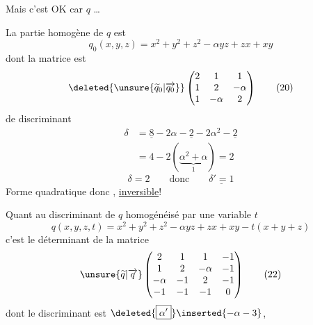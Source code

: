 Mais c'est OK car $q$ \ldots


La partie homogène de $q$ est
\[
q_0(x,y,z)=x^2+y^2+z^2-\alpha yz+zx+xy\tag*{(19)}
\]
dont la matrice est
\[
\deleted{\unsure{\widetilde q_0|\overrightarrow{q_0}}}
\begin{pmatrix}2&1&1\\1&2&-\alpha\\1&-\alpha&2\end{pmatrix}\tag*{(20)}
\]
de discriminant
\[
\begin{aligned}
\delta&=\underline{8}-2\alpha-\underline{2}-2\alpha^2-\underline{2}\\
&=4-2(\underbrace{\alpha^2+\alpha}_{1})=2
\end{aligned}
\]
\[
\delta=2\qquad\text{donc}\qquad\underline{\delta'=1}\tag*{(21)}
\]
Forme quadratique donc , \uline{inversible}!

Quant au discriminant de $q$ homogénéisé par une variable $t$
\[
q(x,y,z,t)=x^2+y^2+z^2-\alpha yz+zx+xy-t(x+y+z)
\]
c'est le déterminant de la matrice
\[
\unsure{\widetilde q|\overrightarrow q}
\begin{pmatrix}
2&1&1&-1\\
1&2&-\alpha&-1\\
-\alpha&-1&2&-1\\
-1&-1&-1&0
\end{pmatrix}\tag*{(22)}
\]
dont le discriminant  est
$\deleted{\boxed{\alpha'}}\inserted{-\alpha-3}$,


